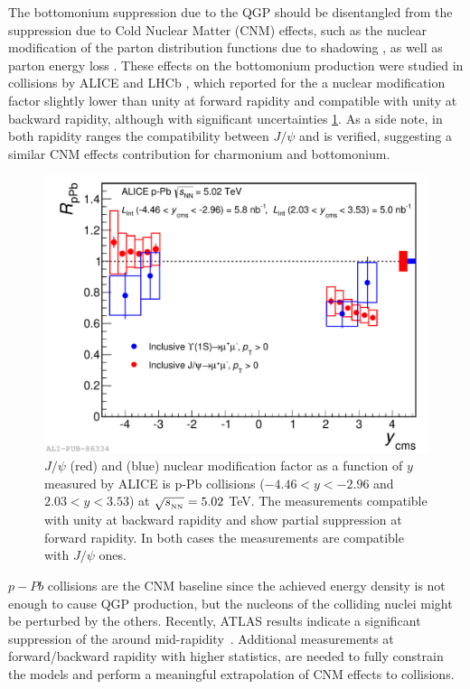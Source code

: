 The bottomonium suppression due to the QGP should be disentangled from the suppression due to Cold Nuclear Matter (CNM) effects, such as the nuclear modification of the parton distribution functions due to shadowing \cite{Eskola:1998df,Eskola:2009uj}, as well as parton energy loss \cite{Arleo:2012rs}.
These effects on the bottomonium production were studied in \ppb collisions by ALICE \cite{Abelev:2014oea} and LHCb \cite{Aaij:2014mza}, which reported for the \upsis a nuclear modification factor slightly lower than unity at forward rapidity and compatible with unity at backward rapidity, although with significant uncertainties \ref{fig:ALICE_pPb_jpsi_upsi}.
As a side note, in both rapidity ranges the compatibility between $J/\psi$ and \upsis is verified, suggesting a similar CNM effects contribution for charmonium and bottomonium.

\begin{figure}[!t]
\begin{center}
\includegraphics[width=0.8\linewidth]{Chapters/Analysis/Figs/2014-Oct-08-RpPb_Ups_Jpsi_b.pdf}
\caption{$J/\psi$ (red) and \upsis (blue) nuclear modification factor as a function of $y$ measured by ALICE is p-Pb collisions ($-4.46<y<-2.96$ and $2.03<y<3.53$) at $\sqrt{s_{_{\rm NN}}}=5.02$ \rm{TeV}. The \upsis measurements compatible with unity at backward rapidity and show partial suppression at forward rapidity. In both cases the \upsis measurements are compatible with $J/\psi$ ones.}
\label{fig:ALICE_pPb_jpsi_upsi}
\end{center}
\end{figure}

$p-Pb$ collisions are the CNM baseline since the achieved energy density is not enough to cause QGP production, but the nucleons of the colliding nuclei might be perturbed by the others.
Recently, ATLAS results indicate a significant suppression of the \upsis around mid-rapidity~\cite{Aaboud:2017cif}.  
Additional measurements at forward/backward rapidity with higher statistics, are needed to fully constrain the models and perform a meaningful extrapolation of CNM effects to \pbpb collisions.

